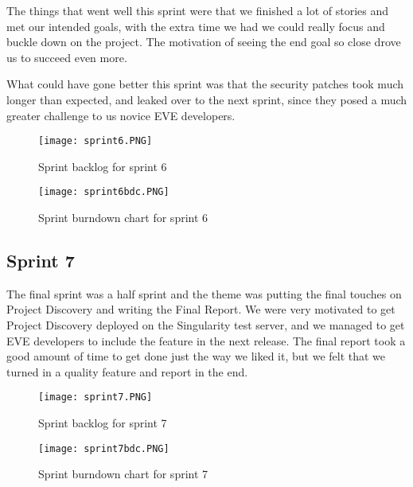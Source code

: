 The things that went well this sprint were that we finished a lot of stories and met our intended goals, with the extra time we had we could really focus and buckle down on the project. The motivation of seeing the end goal so close drove us to succeed even more.

What could have gone better this sprint was that the security patches took much longer than expected, and leaked over to the next sprint, since they posed a much greater challenge to us novice EVE developers.

\begin{landscape}

\begin{figure}[H]
	\centering
	\graphicspath{ {./graphics/} }
    \centerline{\texttt{[image: sprint6.PNG]}}
    \caption{\label{fig:s6}Sprint backlog for sprint 6}
\end{figure}

\end{landscape}

\begin{figure}[H]
	\centering
	\graphicspath{ {./graphics/} }
    \centerline{\texttt{[image: sprint6bdc.PNG]}}
    \caption{\label{fig:s6bd}Sprint burndown chart for sprint 6}
\end{figure}

\subsection{Sprint 7}
The final sprint was a half sprint and the theme was putting the final touches on Project Discovery and writing the Final Report. We were very motivated to get Project Discovery deployed on the Singularity test server, and we managed to get EVE developers to include the feature in the next release. The final report took a good amount of time to get done just the way we liked it, but we felt that we turned in a quality feature and report in the end.

\begin{landscape}

\begin{figure}[H]
	\centering
	\graphicspath{ {./graphics/} }
    \centerline{\texttt{[image: sprint7.PNG]}}
    \caption{\label{fig:s7}Sprint backlog for sprint 7}
\end{figure}

\end{landscape}

\begin{figure}[H]
	\centering
	\graphicspath{ {./graphics/} }
    \centerline{\texttt{[image: sprint7bdc.PNG]}}
    \caption{\label{fig:s7bd}Sprint burndown chart for sprint 7}
\end{figure}
 